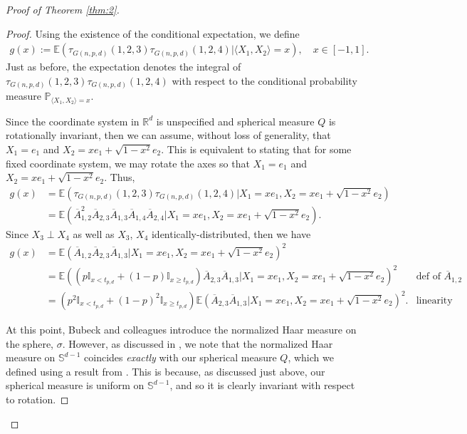 \documentclass{article}
\begin{document}
\begin{proof}[Proof of Theorem \ref{thm:2}]
\begin{proof}
Using the existence of the conditional expectation, we define 
\begin{align}
    g(x) := \mathbb{E}\left( \tau_{G(n,p,d)}(1,2,3)\tau_{G(n,p,d)}(1,2,4) | \langle X_1, X_2 \rangle = x \right), \quad x \in [-1,1]\label{eq13}.
\end{align}
Just as before, the expectation denotes the integral of $\tau_{G(n,p,d)}(1,2,3)\tau_{G(n,p,d)}(1,2,4)$ with respect to the conditional probability measure $\mathbb{P}_{ \langle X_1, X_2 \rangle = x}.$ 

Since the coordinate system in $\mathbb{R}^d$ is unspecified and spherical measure $Q$ is rotationally invariant, then we can assume, without loss of generality, that $X_1 = e_1$ and $X_2 = xe_1 + \sqrt{1-x^2}e_2.$ This is equivalent to stating that for some fixed coordinate system, we may rotate the axes so that $X_1 = e_1$ and $X_2 = xe_1 + \sqrt{1-x^2}e_2.$ Thus,
\begin{align*}
    g(x) &= \mathbb{E}\left( \tau_{G(n,p,d)}(1,2,3)\tau_{G(n,p,d)}(1,2,4) | X_1 = xe_1, X_2 = xe_1 + \sqrt{1-x^2}e_2\right)\\
    &= \mathbb{E}\left( \overline{A}_{1,2}^2\overline{A}_{2,3}\overline{A}_{1,3}\overline{A}_{1,4}\overline{A}_{2,4} | X_1 = xe_1, X_2 = xe_1 + \sqrt{1-x^2}e_2\right).
\end{align*}
Since $X_3 \perp X_4$ as well as $X_3$, $X_4$ identically-distributed, then we have
\begin{align}
    g(x) &= \mathbb{E}\left( \overline{A}_{1,2}\overline{A}_{2,3}\overline{A}_{1,3} | X_1 = xe_1, X_2 = xe_1 + \sqrt{1-x^2}e_2\right)^2 \nonumber\\
    &= \mathbb{E}\left(\left(p\mathbb{I}_{ x < t_{p,d}} + (1-p)\mathbb{I}_{ x \geq t_{p,d}}\right)\overline{A}_{2,3}\overline{A}_{1,3} | X_1 = xe_1, X_2 = xe_1 + \sqrt{1-x^2}e_2\right)^2 & \text{def of $\overline{A}_{1,2}$} \nonumber\\
    &= \left(p^2\mathbb{I}_{ x < t_{p,d}} + (1-p)^2\mathbb{I}_{ x \geq t_{p,d}} \right)\mathbb{E}\left(\overline{A}_{2,3}\overline{A}_{1,3} | X_1 = xe_1, X_2 = xe_1 + \sqrt{1-x^2}e_2\right)^2.& \text{linearity}\label{eq10}
\end{align}

At this point, Bubeck and colleagues introduce the normalized Haar measure on the sphere, $\sigma$. However, as discussed in \cite{Naverniouk2006}, we note that the normalized Haar measure on $\mathbb{S}^{d-1}$ coincides \textit{exactly} with our spherical measure $Q$, which we defined using a result from \cite{folland1999real}. This is because, as discussed just above, our spherical measure is uniform on $\mathbb{S}^{d-1}$, and so it is clearly invariant with respect to rotation. 


\end{proof}
\end{proof}
\end{document}
